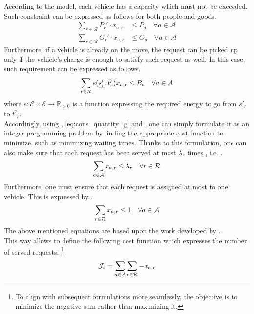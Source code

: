 According to the model, each vehicle has a capacity which must not be exceeded. Such constraint can be expressed as follows for both people and goods. 
\begin{align}
	\sum_{r \in \mathcal{R}} P_r' \cdot x_{a,r} &\leq P_a \quad \forall a \in \mathcal{A}\label{eq:cons_quantity_p}\\
	\sum_{r \in \mathcal{R}} G_r' \cdot x_{a,r} &\leq G_a \quad \forall a \in \mathcal{A}\label{eq:cons_quantity_g}
\end{align}
Furthermore, if a vehicle is already on the move, the request can be picked up only if the vehicle's charge is enough to satisfy such request as well. In this case, such requirement can be expressed as follows. 
\begin{equation}
	\sum_{r \in \mathcal{R}} e(\underline{s'_r}, \bar{t'_r}) x_{a,r}\leq B_a \quad \forall a \in \mathcal{A}\\
	\label{eq:cons_charg}
\end{equation}
where $e: \mathcal{E} \times \mathcal{E} \rightarrow \mathbb{R}_{>0}$ is a function expressing the required energy to go from $\underline{s'_r}$ to $\bar{t'_r}$.\\
Accordingly, using , \ref{eq:cons_quantity_g}  and  , one can simply formulate it as an integer programming problem by finding the appropriate cost function to minimize, such as minimizing waiting times. Thanks to this formulation, one can also make sure that each request has been served at most $\lambda_r$ times , i.e. . 
\begin{equation}
	\sum_{a \in \mathcal{A}} x_{a,r} \leq \lambda_r \quad \forall r \in \mathcal{R}\\
	\label{eq:req_served}
\end{equation}
Furthermore, one must ensure that each request is assigned at most to one vehicle. This is expressed by . 
\begin{equation}
	\sum_{r \in \mathcal{R}} x_{a,r} \leq 1\quad \forall a \in \mathcal{A}\\
	\label{eq:req_served_per_vehicle}
\end{equation}
The above mentioned equations are based upon the work developed by . \\
This way allows to define the following cost function which expresses the number of served requests. \footnote{To align with subsequent formulations more seamlessly, the objective is to minimize the negative sum rather than maximizing it.}
\begin{equation}
	\mathcal{J}_s = \sum_{a \in \mathcal{A}}\sum_{r \in \mathcal{R}} -x_{a,r}\\
	\label{eq:req_served_cfunction}
\end{equation}

